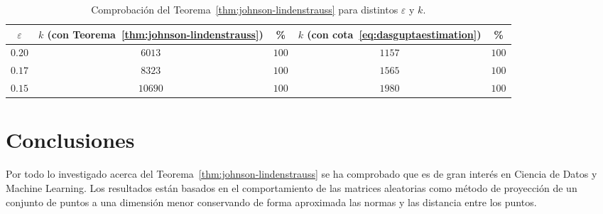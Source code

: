 \begin{table}[ht!]
	\centering
	\caption{Comprobación del Teorema~\ref{thm:johnson-lindenstrauss} para distintos $\varepsilon$ y $k$.}
	\begin{tabular}{ccccc}
		\hline
		$\varepsilon$ & $k$ (con Teorema~\ref{thm:johnson-lindenstrauss}) & \%    & $k$ (con cota~\eqref{eq:dasguptaestimation}) & \%    \\
		\hline
		$0.20$        & $6013$                                            & $100$ & $1157$                                       & $100$ \\
		\hline
		$0.17$        & $8323$                                            & $100$ & $1565$                                       & $100$ \\
		\hline
		$0.15$        & $10690$                                           & $100$ & $1980$                                       & $100$ \\
		\hline
	\end{tabular}
	\label{tab:verification}
\end{table}



\chapter{Conclusiones}

Por todo lo investigado acerca del Teorema~\ref{thm:johnson-lindenstrauss}
se ha comprobado que es de gran interés en Ciencia de Datos y Machine Learning.
Los resultados están basados en el comportamiento de las matrices aleatorias como
método de proyección de un conjunto de puntos a una dimensión menor conservando
de forma aproximada las normas y las distancia entre los puntos.

